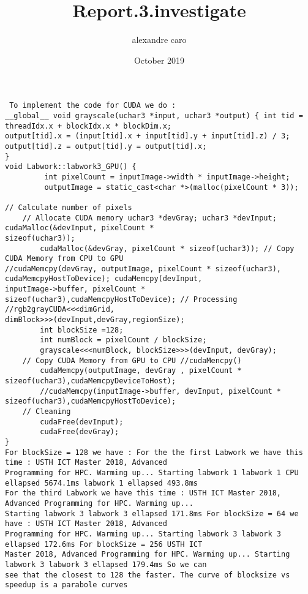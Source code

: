 \documentclass{article} \usepackage[utf8]{inputenc} \title{Report.3.investigate} \author{alexandre caro }
\date{October 2019}
\begin{document}
 \maketitle \begin{verbatim} To implement the code for CUDA we do : 
__global__ void grayscale(uchar3 *input, uchar3 *output) { int tid = threadIdx.x + blockIdx.x * blockDim.x; 
output[tid].x = (input[tid].x + input[tid].y + input[tid].z) / 3; output[tid].z = output[tid].y = output[tid].x;
}
void Labwork::labwork3_GPU() {
         int pixelCount = inputImage->width * inputImage->height;
         outputImage = static_cast<char *>(malloc(pixelCount * 3));
                                                                                                                            // Calculate number of pixels
    // Allocate CUDA memory uchar3 *devGray; uchar3 *devInput; cudaMalloc(&devInput, pixelCount * 
sizeof(uchar3));
        cudaMalloc(&devGray, pixelCount * sizeof(uchar3)); // Copy CUDA Memory from CPU to GPU 
//cudaMemcpy(devGray, outputImage, pixelCount * sizeof(uchar3), cudaMemcpyHostToDevice); cudaMemcpy(devInput, 
inputImage->buffer, pixelCount * sizeof(uchar3),cudaMemcpyHostToDevice); // Processing //rgb2grayCUDA<<<dimGrid, 
dimBlock>>>(devInput,devGray,regionSize);
        int blockSize =128;
        int numBlock = pixelCount / blockSize;
        grayscale<<<numBlock, blockSize>>>(devInput, devGray);
    // Copy CUDA Memory from GPU to CPU //cudaMencpy()
        cudaMemcpy(outputImage, devGray , pixelCount * sizeof(uchar3),cudaMemcpyDeviceToHost);
        //cudaMemcpy(inputImage->buffer, devInput, pixelCount * sizeof(uchar3),cudaMemcpyHostToDevice);
    // Cleaning
        cudaFree(devInput);
        cudaFree(devGray);
}                         
For blockSize = 128 we have : For the the first Labwork we have this time : USTH ICT Master 2018, Advanced 
Programming for HPC. Warming up... Starting labwork 1 labwork 1 CPU ellapsed 5674.1ms labwork 1 ellapsed 493.8ms 
For the third Labwork we have this time : USTH ICT Master 2018, Advanced Programming for HPC. Warming up... 
Starting labwork 3 labwork 3 ellapsed 171.8ms For blockSize = 64 we have : USTH ICT Master 2018, Advanced 
Programming for HPC. Warming up... Starting labwork 3 labwork 3 ellapsed 172.6ms For blockSize = 256 USTH ICT 
Master 2018, Advanced Programming for HPC. Warming up... Starting labwork 3 labwork 3 ellapsed 179.4ms So we can 
see that the closest to 128 the faster. The curve of blocksize vs speedup is a parabole curves \end{verbatim} 
\end{document}
